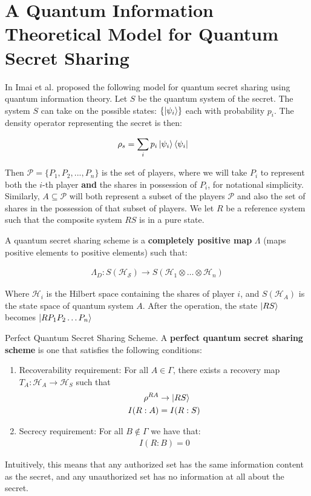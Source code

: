 \section{A Quantum Information Theoretical Model for Quantum Secret Sharing}

In \cite{imai_quantum_2003} Imai et al. proposed the following model for quantum secret sharing using quantum information theory. Let $S$ be the quantum system of the secret. The system $S$ can take on the possible states: $\{\ket{\psi_i}\}$ each with probability $p_i$. The density operator representing the secret is then:

\begin{align}
    \rho_s &= \sum_i p_i \ket{\psi_i} \bra{\psi_i}
\end{align}

Then $\mathcal{P} = \{P_1,P_2,...,P_n\}$ is the set of players, where we will take $P_i$ to represent both the $i$-th player \textbf{and} the shares in possession of $P_i$, for notational simplicity. Similarly, $A \subseteq \mathcal{P}$ will both represent a subset of the players $\mathcal{P}$ and also the set of shares in the possession of that subset of players. We let $R$ be a reference system such that the composite system $RS$ is in a pure state.

A quantum secret sharing scheme is a \textbf{completely positive map} $\Lambda$ (maps positive elements to positive elements) such that:

\begin{align}
    \Lambda_D: S(\mathcal{H_S}) \to S(\mathcal{H}_1 \otimes \dots \otimes \mathcal{H}_n)
\end{align}

Where $\mathcal{H}_i$ is the Hilbert space containing the shares of player $i$, and $S(\mathcal{H}_A)$ is the state space of quantum system $A$. After the operation, the state $\ket{RS}$ becomes $\ket{RP_1P_2 \dots P_n}$

\begin{definition}{Perfect Quantum Secret Sharing Scheme.}
    \label{defn:perfect-qss}
    A \textbf{perfect quantum secret sharing scheme} is one that satisfies the following conditions:

    \begin{enumerate}
        \item Recoverability requirement: For all $A \in \Gamma$, there exists a recovery map $T_A: \mathcal{H}_A \to \mathcal{H}_S$ such that 
        \begin{align} 
            \rho^{RA} &\to \ket{RS} \\
            I(R:A) &= I(R:S)
        \end{align}
        \item Secrecy requirement: For all $B \notin \Gamma$ we have that:
        \begin{align}
            I(R:B) = 0
        \end{align}
    \end{enumerate}

    Intuitively, this means that any authorized set has the same information content as the secret, and any unauthorized set has no information at all about the secret.
\end{definition}

